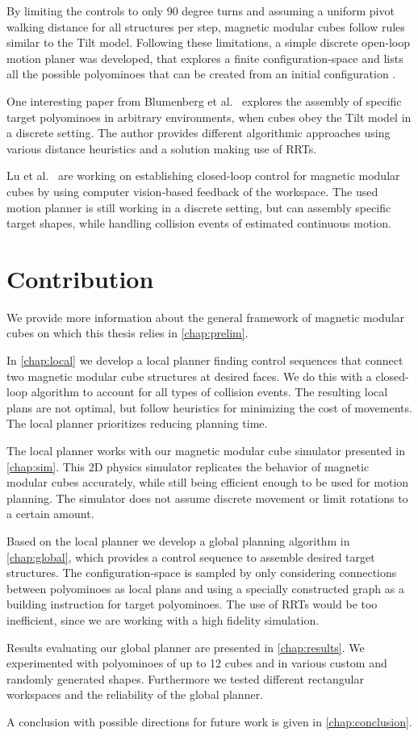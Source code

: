 By limiting the controls to only 90 degree turns and assuming a uniform pivot walking distance for all structures per step, magnetic modular cubes follow rules similar to the Tilt model.
Following these limitations, a simple discrete open-loop motion planer was developed, that explores a finite configuration-space and lists all the possible polyominoes that can be created from an initial configuration \cite{Bhattacharjee2022}.

One interesting paper from Blumenberg et al.\ \cite{blumenberg2023} explores the assembly of specific target polyominoes in arbitrary environments, when cubes obey the Tilt model in a discrete setting.
The author provides different algorithmic approaches using various distance heuristics and a solution making use of RRTs.

Lu et al.\ \cite{Lu2023} are working on establishing closed-loop control for magnetic modular cubes by using computer vision-based feedback of the workspace.
The used motion planner is still working in a discrete setting, but can assembly specific target shapes, while handling collision events of estimated continuous motion.



\section{Contribution}

We provide more information about the general framework of magnetic modular cubes on which this thesis relies in \autoref{chap:prelim}.

In \autoref{chap:local} we develop a local planner finding control sequences that connect two magnetic modular cube structures at desired faces.
We do this with a closed-loop algorithm to account for all types of collision events.
The resulting local plans are not optimal, but follow heuristics for minimizing the cost of movements.
The local planner prioritizes reducing planning time. 

The local planner works with our magnetic modular cube simulator presented in \autoref{chap:sim}.
This 2D physics simulator replicates the behavior of magnetic modular cubes accurately, while still being efficient enough to be used for motion planning.
The simulator does not assume discrete movement or limit rotations to a certain amount.

Based on the local planner we develop a global planning algorithm in \autoref{chap:global}, which provides a control sequence to assemble desired target structures.
The configuration-space is sampled by only considering connections between polyominoes as local plans and using a specially constructed graph as a building instruction for target polyominoes.
The use of RRTs would be too inefficient, since we are working with a high fidelity simulation. 

Results evaluating our global planner are presented in \autoref{chap:results}.
We experimented with polyominoes of up to 12 cubes and in various custom and randomly generated shapes.
Furthermore we tested different rectangular workspaces and the reliability of the global planner.  

A conclusion with possible directions for future work is given in \autoref{chap:conclusion}.
